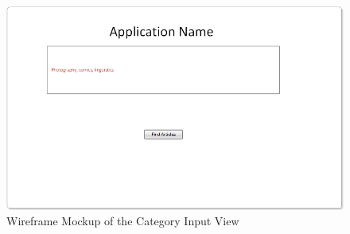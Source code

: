 \begin{figure}
	\caption{Wireframe Mockup of the Category Input View}
	\label{fig:view1}
	\includegraphics[width=\textwidth]{Graphics/View1}
\end{figure}